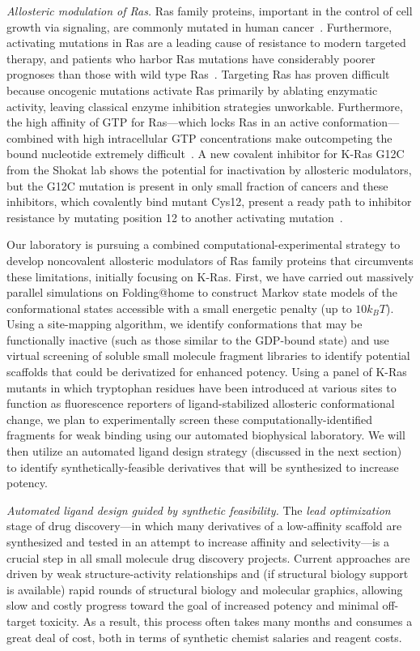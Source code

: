 \documentclass[10pt]{article}
\begin{document}
\emph{Allosteric modulation of Ras.}  
Ras family proteins, important in the control of cell growth via signaling, are commonly mutated in human cancer~\cite{Pylayeva-Gupta:2011:Nat.Rev.Cancer}. 
Furthermore, activating mutations in Ras are a leading cause of resistance to modern targeted therapy, and patients who harbor Ras mutations have considerably poorer prognoses than those with wild type Ras~\cite{Mak:2015:Clin.LungCancer}. 
Targeting Ras has proven difficult because oncogenic mutations activate Ras primarily by ablating enzymatic activity, leaving classical enzyme inhibition strategies unworkable.
Furthermore, the high affinity of GTP for Ras---which locks Ras in an active conformation---combined with high intracellular GTP concentrations make outcompeting the bound nucleotide extremely difficult~\cite{Ostrem:2013:Naturea}.
A new covalent inhibitor for K-Ras G12C from the Shokat lab shows the potential for inactivation by allosteric modulators, but the G12C mutation is present in only small fraction of cancers and these inhibitors, which covalently bind mutant Cys12, present a ready path to inhibitor resistance by mutating position 12 to another activating mutation~\cite{Ostrem:2013:Naturea}.

Our laboratory is pursuing a combined computational-experimental strategy to develop noncovalent allosteric modulators of Ras family proteins that circumvents these limitations, initially focusing on K-Ras.
First, we have carried out massively parallel simulations on Folding@home to construct Markov state models of the conformational states accessible with a small energetic penalty (up to $10 k_B T$).
Using a site-mapping algorithm, we identify conformations that may be functionally inactive (such as those similar to the GDP-bound state) and use virtual screening of soluble small molecule fragment libraries to identify potential scaffolds that could be derivatized for enhanced potency.
Using a panel of K-Ras mutants in which tryptophan residues have been introduced at various sites to function as fluorescence reporters of ligand-stabilized allosteric conformational change, we plan to experimentally screen these computationally-identified fragments for weak binding using our automated biophysical laboratory.
We will then utilize an automated ligand design strategy (discussed in the next section) to identify synthetically-feasible derivatives that will be synthesized to increase potency.

\emph{Automated ligand design guided by synthetic feasibility.}
The \emph{lead optimization} stage of drug discovery---in which many derivatives of a low-affinity scaffold are synthesized and tested in an attempt to increase affinity and selectivity---is a crucial step in all small molecule drug discovery projects.
Current approaches are driven by weak structure-activity relationships and (if structural biology support is available) rapid rounds of structural biology and molecular graphics, allowing slow and costly progress toward the goal of increased potency and minimal off-target toxicity.
As a result, this process often takes many months and consumes a great deal of cost, both in terms of synthetic chemist salaries and reagent costs.
\end{document}
